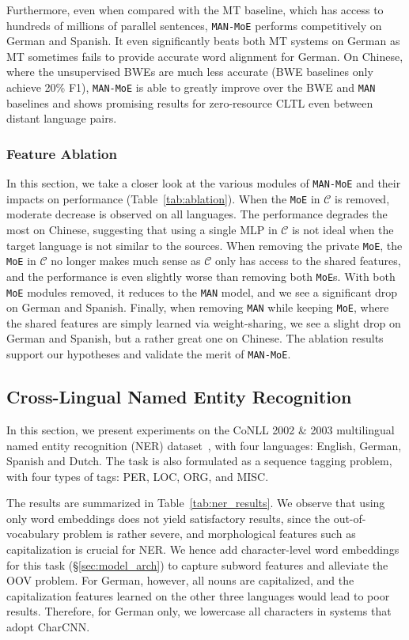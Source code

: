 \documentclass[11pt,a4paper]{article}
\newcommand{\secref}[1]{\S\ref{#1}}
\def\gC{{\mathcal{C}}}
\newcommand{\manmoe}{\texttt{MAN-MoE}}
\newcommand{\man}{\texttt{MAN}}
\newcommand{\moe}{\texttt{MoE}}
\begin{document}
Furthermore, even when compared with the MT baseline, which has access to hundreds of millions of parallel sentences, \manmoe{} performs competitively on German and Spanish.
It even significantly beats both MT systems on German as MT sometimes fails to provide accurate word alignment for German.
On Chinese, where the unsupervised BWEs are much less accurate (BWE baselines only achieve 20\% F1), \manmoe{} is able to greatly improve over the BWE and \man{} baselines and shows promising results for zero-resource CLTL even between distant language pairs.

\subsubsection{Feature Ablation}\label{sec:exp:ablation}

In this section, we take a closer look at the various modules of \manmoe{} and their impacts on performance (Table~\ref{tab:ablation}).
When the \moe{} in $\gC$ is removed, moderate decrease is observed on all languages.
The performance degrades the most on Chinese, suggesting that using a single MLP in $\gC$ is not ideal when the target language is not similar to the sources.
When removing the private \moe{}, the \moe{} in $\gC$ no longer makes much sense as $\gC$ only has access to the shared features, and the performance is even slightly worse than removing both \moe{}s.
With both \moe{} modules removed, it reduces to the \man{} model, and we see a significant drop on German and Spanish.
Finally, when removing \man{} while keeping \moe{}, where the shared features are simply learned via weight-sharing, we see a slight drop on German and Spanish, but a rather great one on Chinese.
The ablation results support our hypotheses and validate the merit of \manmoe{}.

\subsection{Cross-Lingual Named Entity Recognition}\label{sec:exp:ner}

In this section, we present experiments on the CoNLL 2002 \& 2003 multilingual named entity recognition (NER) dataset~\cite{W02-2024,W03-0419}, with four languages: English, German, Spanish and Dutch.
The task is also formulated as a sequence tagging problem, with four types of tags: PER, LOC, ORG, and MISC.

The results are summarized in Table~\ref{tab:ner_results}.
We observe that using only word embeddings does not yield satisfactory results, since the out-of-vocabulary problem is rather severe, and morphological features such as capitalization is crucial for NER.
We hence add character-level word embeddings for this task (\secref{sec:model_arch}) to capture subword features and alleviate the OOV problem.
For German, however, all nouns are capitalized, and the capitalization features learned on the other three languages would lead to poor results.
Therefore, for German only, we lowercase all characters in systems that adopt CharCNN.
\end{document}
